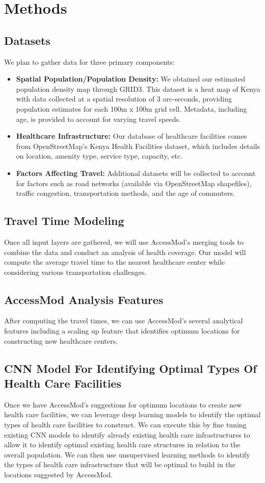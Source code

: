 \documentclass[11pt]{article}
\begin{document}
\section{Methods}
\subsection{Datasets}
We plan to gather data for three primary components:
\begin{itemize}
    \item \textbf{Spatial Population/Population Density:} We obtained our estimated population density map through GRID3. This dataset is a heat map of Kenya with data collected at a spatial resolution of 3 arc-seconds, providing population estimates for each 100m x 100m grid cell. Metadata, including age, is provided to account for varying travel speeds.
    \item \textbf{Healthcare Infrastructure:} Our database of healthcare facilities comes from OpenStreetMap’s Kenya Health Facilities dataset, which includes details on location, amenity type, service type, capacity, etc.
    \item \textbf{Factors Affecting Travel:} Additional datasets will be collected to account for factors such as road networks (available via OpenStreetMap shapefiles), traffic congestion, transportation methods, and the age of commuters.
\end{itemize}

\subsection{Travel Time Modeling}
Once all input layers are gathered, we will use AccessMod’s merging tools to combine the data and conduct an analysis of health coverage. Our model will compute the average travel time to the nearest healthcare center while considering various transportation challenges.

\subsection{AccessMod Analysis Features}
After computing the travel times, we can use AccessMod's several analytical features including a scaling up feature that identifies optimum locations for constructing new healthcare centers.

\subsection{CNN Model For Identifying Optimal Types Of Health Care Facilities}
Once we have AccessMod's suggestions for optimum locations to create new health care facilities, we can leverage deep learning models to identify the optimal types of health care facilities to construct. We can execute this by fine tuning existing CNN models to identify already existing health care infrastructures to allow it to identify optimal existing health care structures in relation to the overall population. We can then use unsupervised learning methods to identify the types of health care infrastructure that will be optimal to build in the locations suggested by AccessMod. 
\end{document}
